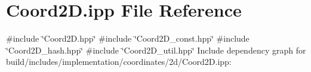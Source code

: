 \hypertarget{build_2includes_2implementation_2coordinates_22d_2Coord2D_8ipp}{}\section{Coord2\+D.\+ipp File Reference}
\label{build_2includes_2implementation_2coordinates_22d_2Coord2D_8ipp}
{\ttfamily \#include \char`\"{}Coord2\+D.\+hpp\char`\"{}}\newline
{\ttfamily \#include \char`\"{}Coord2\+D\+\_\+const.\+hpp\char`\"{}}\newline
{\ttfamily \#include \char`\"{}Coord2\+D\+\_\+hash.\+hpp\char`\"{}}\newline
{\ttfamily \#include \char`\"{}Coord2\+D\+\_\+util.\+hpp\char`\"{}}\newline
Include dependency graph for build/includes/implementation/coordinates/2d/\+Coord2D.ipp\+:
